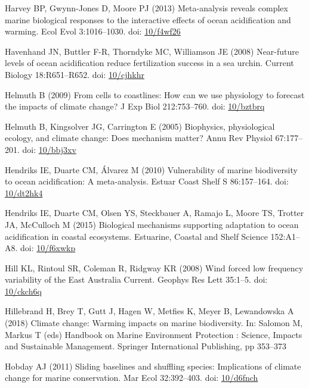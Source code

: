 \documentclass[a4paper,10pt, oneside]{memoir}
\begin{document}
\leavevmode\hypertarget{ref-Harvey2013}{}%
Harvey BP, Gwynn-Jones D, Moore PJ (2013) Meta-analysis reveals complex marine biological responses to the interactive effects of ocean acidification and warming. Ecol Evol 3:1016--1030. doi: \href{https://doi.org/10/f4wf26}{10/f4wf26}

\leavevmode\hypertarget{ref-Havenhand2008}{}%
Havenhand JN, Buttler F-R, Thorndyke MC, Williamson JE (2008) Near-future levels of ocean acidification reduce fertilization success in a sea urchin. Current Biology 18:R651--R652. doi: \href{https://doi.org/10/cjhkhr}{10/cjhkhr}

\leavevmode\hypertarget{ref-Helmuth2009}{}%
Helmuth B (2009) From cells to coastlines: How can we use physiology to forecast the impacts of climate change? J Exp Biol 212:753--760. doi: \href{https://doi.org/10/bztbrq}{10/bztbrq}

\leavevmode\hypertarget{ref-Helmuth2005}{}%
Helmuth B, Kingsolver JG, Carrington E (2005) Biophysics, physiological ecology, and climate change: Does mechanism matter? Annu Rev Physiol 67:177--201. doi: \href{https://doi.org/10/bbj3xv}{10/bbj3xv}

\leavevmode\hypertarget{ref-Hendriks2010}{}%
Hendriks IE, Duarte CM, Álvarez M (2010) Vulnerability of marine biodiversity to ocean acidification: A meta-analysis. Estuar Coast Shelf S 86:157--164. doi: \href{https://doi.org/10/dt2hk4}{10/dt2hk4}

\leavevmode\hypertarget{ref-Hendriks2015}{}%
Hendriks IE, Duarte CM, Olsen YS, Steckbauer A, Ramajo L, Moore TS, Trotter JA, McCulloch M (2015) Biological mechanisms supporting adaptation to ocean acidification in coastal ecosystems. Estuarine, Coastal and Shelf Science 152:A1--A8. doi: \href{https://doi.org/10/f6xwkp}{10/f6xwkp}

\leavevmode\hypertarget{ref-Hill2008}{}%
Hill KL, Rintoul SR, Coleman R, Ridgway KR (2008) Wind forced low frequency variability of the East Australia Current. Geophys Res Lett 35:1--5. doi: \href{https://doi.org/10/ckch6q}{10/ckch6q}

\leavevmode\hypertarget{ref-Hillebrand2018}{}%
Hillebrand H, Brey T, Gutt J, Hagen W, Metfies K, Meyer B, Lewandowska A (2018) Climate change: Warming impacts on marine biodiversity. In: Salomon M, Markus T (eds) Handbook on Marine Environment Protection : Science, Impacts and Sustainable Management. Springer International Publishing, pp 353--373

\leavevmode\hypertarget{ref-Hobday2011}{}%
Hobday AJ (2011) Sliding baselines and shuffling species: Implications of climate change for marine conservation. Mar Ecol 32:392--403. doi: \href{https://doi.org/10/d6fnch}{10/d6fnch}
\end{document}
